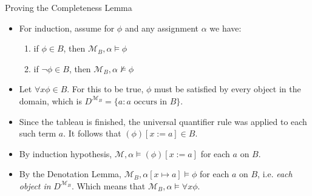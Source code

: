 \begin{frame}{Proving the Completeness Lemma}

	\begin{itemize}
	\itemsep=10pt

	\item For induction, assume for $\phi$ and any assignment $\alpha$ we have:
		\begin{enumerate}[1.]

                      \item if $\phi\in B$, then
                        $\mathcal{M}_B,\alpha\vDash\phi$

                        \item if $\neg\phi\in B$, then
                          $\mathcal{M}_B,\alpha\nvDash\phi$ 
                      
		\end{enumerate}

	\item Let $\forall x\phi\in B$. For this to be true, $\phi$ must be satisfied by every object in the domain, which is $D^{\mathcal{M}_B}=\{a: a\text{ occurs in } B\}$.

	\item Since the tableau is finished, the universal quantifier rule was applied to each such term $a$.
	It follows that $(\phi)[x:=a]\in B$.

	\item By induction hypothesis, $\mathcal{M},\alpha\vDash (\phi)[x:=a]$ for each $a$ on $B$.

	\item By the Denotation Lemma, $\mathcal{M}_B,\alpha[x\mapsto a]\vDash \phi$ for each $a$ on $B$, i.e. \emph{each object in} $D^{\mathcal{M}_B}$. 
	Which means that $\mathcal{M}_B,\alpha\vDash\forall x \phi$.
                        
  \end{itemize}
  
\end{frame}

